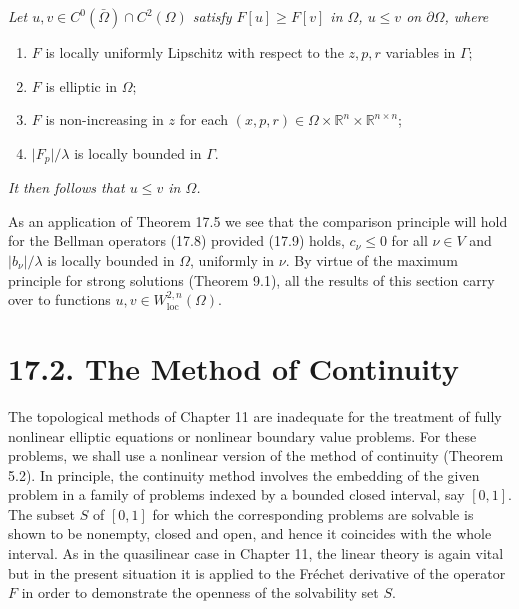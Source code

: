 \begin{theorem}[Theorem 17.5]\label{gt-ch17-thm-17-5}
\textit{Let $u, v \in C^0(\bar{\Omega}) \cap C^2(\Omega)$ satisfy $F[u] \geq F[v]$ in $\Omega$, $u \leq v$ on $\partial\Omega$, where}

\begin{enumerate}
\item[(i)] $F$ is locally uniformly Lipschitz with respect to the $z, p, r$ variables in $\Gamma$;
\item[(ii)] $F$ is elliptic in $\Omega$;
\item[(iii)] $F$ is non-increasing in $z$ for each $(x, p, r) \in \Omega \times \mathbb{R}^n \times \mathbb{R}^{n \times n}$;
\item[(iv)] $\lvert F_p\rvert/\lambda$ is locally bounded in $\Gamma$.
\end{enumerate}

\noindent\textit{It then follows that $u \leq v$ in $\Omega$.}
\end{theorem}

\medskip

As an application of Theorem 17.5 we see that the comparison principle will hold for the Bellman operators (17.8) provided (17.9) holds, $c_\nu \leq 0$ for all $\nu \in V$ and $\lvert b_\nu\rvert/\lambda$ is locally bounded in $\Omega$, uniformly in $\nu$. By virtue of the maximum principle for strong solutions (Theorem 9.1), all the results of this section carry over to functions $u, v \in W^{2,n}_{\mathrm{loc}}(\Omega)$.

\section*{17.2. The Method of Continuity}

The topological methods of Chapter 11 are inadequate for the treatment of fully nonlinear elliptic equations or nonlinear boundary value problems. For these problems, we shall use a nonlinear version of the method of continuity (Theorem 5.2). In principle, the continuity method involves the embedding of the given problem in a family of problems indexed by a bounded closed interval, say $[0, 1]$. The subset $S$ of $[0, 1]$ for which the corresponding problems are solvable is shown to be nonempty, closed and open, and hence it coincides with the whole interval. As in the quasilinear case in Chapter 11, the linear theory is again vital but in the present situation it is applied to the Fréchet derivative of the operator $F$ in order to demonstrate the openness of the solvability set $S$.

